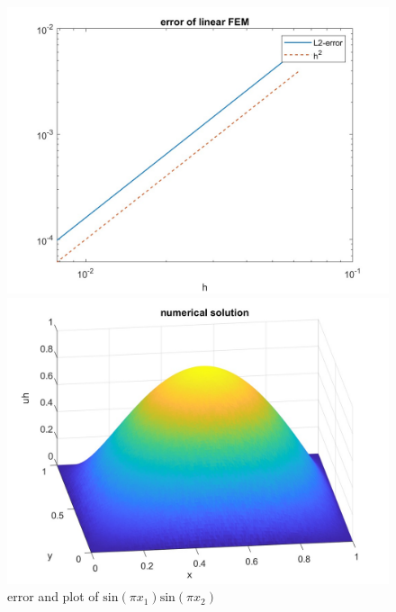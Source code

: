 \documentclass{article}
\begin{document}
\begin{figure}[!h]
	\begin{minipage}[c]{0.5\linewidth}
		\includegraphics[width=\linewidth]{E2error.jpg}
	\end{minipage}
	\begin{minipage}[c]{0.5\linewidth}
		\includegraphics[width=\linewidth]{E2NumSol.jpg}
	\end{minipage}
	\label{fig:E2}
	\caption{error and plot of $\text{sin}(\pi x_1)\text{sin}(\pi x_2)$}
\end{figure}
\end{document}
